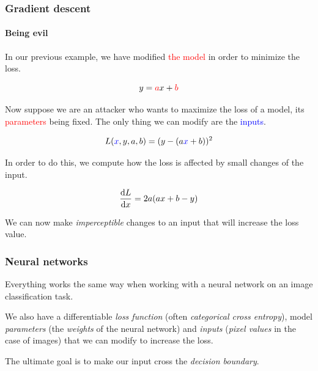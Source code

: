 \documentclass[9pt]{beamer}
\begin{document}
\begin{frame}
  \frametitle{Gradient descent}

  \framesubtitle{Being evil}

  \vspace{-0.5cm}

  \begin{center}
    \scalebox{0.5}{
      
    }
  \end{center}

  In our previous example, we have modified \textcolor{red}{the model}
  in order to minimize the loss.

  \[
  y = \textcolor{red}{a}x + \textcolor{red}{b}
  \]

  \pause

  Now suppose we are an attacker who wants to maximize the loss of a
  model, its \textcolor{red}{parameters} being fixed. The only thing
  we can modify are the \textcolor{blue}{inputs}.

  \[
  L(\textcolor{blue}{x}, y, a, b) = (y - (a \textcolor{blue}{x} + b))^{2}
  \]

  \pause

  In order to do this, we compute how the loss is affected by small
  changes of the input.

  \[
  \frac{\mathrm{d} L}{\mathrm{d} x} = 2 a (ax + b - y)
  \]

  We can now make \emph{imperceptible} changes to an input that will
  increase the loss value.
\end{frame}

\begin{frame}
  \frametitle{Neural networks}

  Everything works the same way when working with a neural network on
  an image classification task.

  \bigskip

  We also have a differentiable \emph{loss function} (often
  \emph{categorical cross entropy}), model \emph{parameters} (the
  \emph{weights} of the neural network) and \emph{inputs} (\emph{pixel
    values} in the case of images) that we can modify to increase the
  loss.

  \bigskip

  The ultimate goal is to make our input cross the \emph{decision
    boundary}.

\end{frame}
\end{document}
